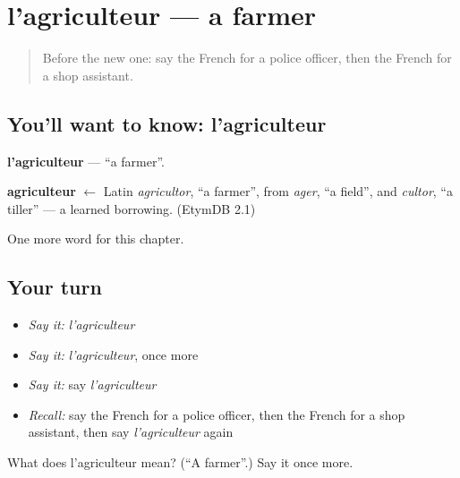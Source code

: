 \section[l'agriculteur]{l'agriculteur — a farmer}

\label{lesson:FR-C123-agriculteur}



\begin{quote}
Before the new one: say the French for a police officer, then the French for a shop assistant.
\end{quote}

\subsection*{You'll want to know: l'agriculteur}
\textbf{l'agriculteur} — \textquotedblleft{}a farmer\textquotedblright{}.

\begin{cousinweb}
\textbf{agriculteur} $\leftarrow$ Latin \emph{agricultor}, \textquotedblleft{}a farmer\textquotedblright{}, from \emph{ager}, \textquotedblleft{}a field\textquotedblright{}, and \emph{cultor}, \textquotedblleft{}a tiller\textquotedblright{} — a learned borrowing. (EtymDB 2.1)
\end{cousinweb}

\begin{grammarlens}[title={What you've built}]
One more word for this chapter.
\end{grammarlens}

\subsection*{Your turn}
\begin{itemize}
\raggedright
  \item \emph{Say it:} \emph{l'agriculteur}
  \item \emph{Say it:} \emph{l'agriculteur}, once more
  \item \emph{Say it:} say \emph{l'agriculteur}
  \item \emph{Recall:} say the French for a police officer, then the French for a shop assistant, then say \emph{l'agriculteur} again
\end{itemize}

\begin{tcolorbox}[breakable,colback=teal!4,colframe=teal!35!black,title={Before you move on}]
What does l'agriculteur mean? (\textquotedblleft{}A farmer\textquotedblright{}.) Say it once more.
\end{tcolorbox}
